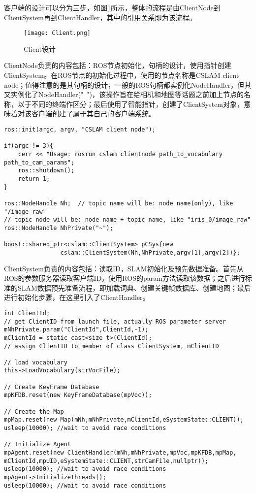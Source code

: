 客户端的设计可以分为三步，如图\ref{fig12}所示，整体的流程是由ClientNode到ClientSystem再到ClientHandler，其中的引用关系即为该流程。
~\\
\begin{figure}[!ht]
	\centering
	\texttt{[image: Client.png]}
	\caption{Client设计}
	\label{fig12}
\end{figure}

ClientNode负责的内容包括：ROS节点初始化，句柄的设计，使用指针创建ClientSystem。在ROS节点的初始化过程中，使用的节点名称是CSLAM client node；值得注意的是其句柄的设计，一般的ROS句柄都实例化NodeHandler，但其又实例化了NodeHandler("~")，该操作旨在给相机和地图等话题之前加上节点的名称，以于不同的终端作区分；最后使用了智能指针，创建了ClientSystem对象，意味着对该客户端创建了属于其自己的客户端系统。

\begin{verbatim}
ros::init(argc, argv, "CSLAM client node");

if(argc != 3){
    cerr << "Usage: rosrun cslam clientnode path_to_vocabulary path_to_cam_params";
    ros::shutdown();
    return 1;
}

ros::NodeHandle Nh;  // topic name will be: node name(only), like "/image_raw"
// topic node will be: node name + topic name, like "iris_0/image_raw"
ros::NodeHandle NhPrivate("~"); 

boost::shared_ptr<cslam::ClientSystem> pCSys{new
                cslam::ClientSystem(Nh,NhPrivate,argv[1],argv[2])};
\end{verbatim}

ClientSystem负责的内容包括：读取ID，SLAM初始化及预先数据准备。首先从ROS的参数服务器读取客户端ID，使用ROS的param方法读取该数据；之后进行标准的SLAM数据预先准备流程，即加载词典、创建关键帧数据库、创建地图；最后进行初始化步骤，在这里引入了ClientHandler。

\begin{verbatim}
int ClientId;
// get ClientID from launch file, actually ROS parameter server
mNhPrivate.param("ClientId",ClientId,-1);
mClientId = static_cast<size_t>(ClientId);
// assign ClientID to member of class ClientSystem, mClientID

// load vocabulary
this->LoadVocabulary(strVocFile);

// Create KeyFrame Database
mpKFDB.reset(new KeyFrameDatabase(mpVoc));

// Create the Map
mpMap.reset(new Map(mNh,mNhPrivate,mClientId,eSystemState::CLIENT));
usleep(10000); //wait to avoid race conditions

// Initialize Agent
mpAgent.reset(new ClientHandler(mNh,mNhPrivate,mpVoc,mpKFDB,mpMap,
mClientId,mpUID,eSystemState::CLIENT,strCamFile,nullptr));
usleep(10000); //wait to avoid race conditions
mpAgent->InitializeThreads();
usleep(10000); //wait to avoid race conditions
\end{verbatim}

